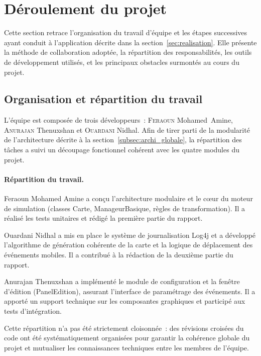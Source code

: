 \section{Déroulement du projet}
\label{sec:deroulement}

Cette section retrace l'organisation du travail d'équipe et les étapes successives
ayant conduit à l'application décrite dans la section~\ref{sec:realisation}. Elle
présente la méthode de collaboration adoptée, la répartition des responsabilités,
les outils de développement utilisés, et les principaux obstacles surmontés au
cours du projet.

\subsection{Organisation et répartition du travail}
\label{subsec:organisation_travail}

L'équipe est composée de trois développeurs~: \textsc{Feraoun} Mohamed~Amine,
\textsc{Anurajan} Thenuxshan et \textsc{Ouardani} Nidhal. Afin de tirer parti de
la modularité de l'architecture décrite à la section~\ref{subsec:archi_globale},
la répartition des tâches a suivi un découpage fonctionnel cohérent avec les
quatre modules du projet.

\paragraph{Répartition du travail.}
Feraoun Mohamed Amine a conçu l'architecture modulaire et le cœur du moteur de
simulation (classes Carte, ManageurBasique, règles de transformation). Il a
réalisé les tests unitaires et rédigé la première partie du rapport.

Ouardani Nidhal a mis en place le système de journalisation Log4j et a développé
l'algorithme de génération cohérente de la carte et la logique de déplacement
des événements mobiles. Il a contribué à la rédaction de la deuxième partie du
rapport.

Anurajan Thenuxshan a implémenté le module de configuration et la fenêtre
d'édition (PanelEdition), assurant l'interface de paramétrage des événements. Il a
apporté un support technique sur les composantes graphiques et participé aux tests
d'intégration.

Cette répartition n'a pas été strictement cloisonnée~: des révisions croisées du
code ont été systématiquement organisées pour garantir la cohérence globale du
projet et mutualiser les connaissances techniques entre les membres de l'équipe.

